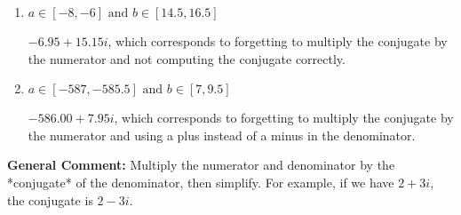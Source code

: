 \documentclass{extbook}[14pt]
\begin{document}
\begin{enumerate}
{\begin{enumerate}[label=\Alph*.]
 $-12.00  - 38.50 i$, which corresponds to just dividing the first term by the first term and the second by the second.
\item \( a \in [-8, -6] \text{ and } b \in [14.5, 16.5] \)

 $-6.95  + 15.15 i$, which corresponds to forgetting to multiply the conjugate by the numerator and not computing the conjugate correctly.
\item \( a \in [-587, -585.5] \text{ and } b \in [7, 9.5] \)

 $-586.00  + 7.95 i$, which corresponds to forgetting to multiply the conjugate by the numerator and using a plus instead of a minus in the denominator.
\end{enumerate}

\textbf{General Comment:} Multiply the numerator and denominator by the *conjugate* of the denominator, then simplify. For example, if we have $2+3i$, the conjugate is $2-3i$.
}
\end{enumerate}
\end{document}
